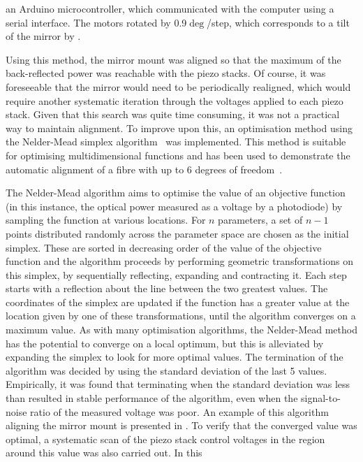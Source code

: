 an Arduino microcontroller, which communicated with the computer using a serial
interface.  The motors rotated by 0.9\(\deg\)/step, which corresponds to a tilt
of the mirror by . 
\par\noindent 
Using this method, the mirror mount was aligned so
that the maximum of the back-reflected power was reachable with the piezo
stacks. Of course, it was foreseeable that the mirror would need to be
periodically realigned, which would require another systematic iteration through
the voltages applied to each piezo stack. Given that this search was quite time
consuming, it was not a practical way to maintain alignment. To improve upon
this, an optimisation method using the Nelder-Mead simplex
algorithm~\cite{Nelder1965} was implemented. This method is suitable for
optimising multidimensional functions and has been used to demonstrate the
automatic alignment of a fibre with up to 6 degrees of freedom~\cite{Zhang2004}.
\par\noindent
The Nelder-Mead algorithm aims to optimise the value of an objective
function (in this instance, the optical power measured as a voltage by a
photodiode) by sampling the function at various locations. For \(n\) parameters,
a set of \(n-1\) points distributed randomly across the parameter space are
chosen as the initial simplex. These are sorted in decreasing order of the value
of the objective function and the algorithm proceeds by performing geometric
transformations on this simplex, by sequentially reflecting, expanding and
contracting it. Each step starts with a reflection about the line
between the two greatest values. The coordinates of the simplex are updated if
the function has a greater value at the location given by one of these
transformations, until the algorithm converges on a maximum value. As with many
optimisation algorithms, the Nelder-Mead method has the potential to converge on
a local optimum, but this is alleviated by expanding the simplex to look for
more optimal values. The termination of the algorithm was decided by using the
standard deviation of the last 5 values. Empirically, it was found that
terminating when the standard deviation was less than 
resulted in stable performance of the algorithm, even when the signal-to-noise
ratio of the measured voltage was poor. An example of this algorithm aligning
the mirror mount is presented in . To verify
that the converged value was optimal, a systematic scan of the piezo stack
control voltages in the region around this value was also carried out. In this
